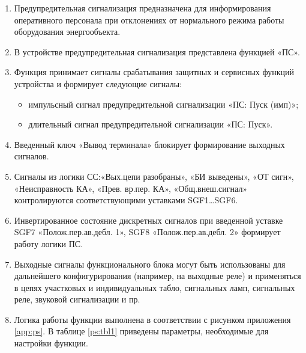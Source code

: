 
\color{black}

\begin{enumerate}

\item	
Предупредительная сигнализация предназначена для информирования оперативного персонала при отклонениях от нормального режима работы оборудования энергообъекта.

\item
В устройстве предупредительная сигнализация представлена функцией «ПС».

\item
Функция принимает сигналы срабатывания защитных и сервисных функций устройства и формирует следующие сигналы:
\begin{itemize}
	\item импульсный сигнал предупредительной сигнализации «ПС: Пуск (имп)»;
	\item длительный сигнал предупредительной сигнализации «ПС: Пуск».
\end{itemize}

\item
Введенный ключ «Вывод терминала» блокирует формирование выходных сигналов.

\item
Сигналы из логики СС:«Вых.цепи разобраны», «БИ выведены», «ОТ сигн», «Неисправность КА», «Прев. вр.пер. КА», «Общ.внеш.сигнал» контролируются соответствующими уставками SGF1\ldots SGF6.

\item
Инвертированное состояние дискретных сигналов при введенной уставке SGF7 «Полож.пер.ав.дебл. 1», SGF8 «Полож.пер.ав.дебл. 2»  формирует работу логики ПС.

\item
Выходные сигналы функционального блока могут быть использованы для дальнейшего конфигурирования (например, на выходные реле) и применяться в цепях участковых и индивидуальных табло, сигнальных ламп, сигнальных реле, звуковой сигнализации и пр.

\item
Логика работы функции выполнена в соответствии с рисунком приложения \ref{app:ps}. В таблице \ref{ps:tbl1} приведены параметры, необходимые для настройки функции. 

\end{enumerate}